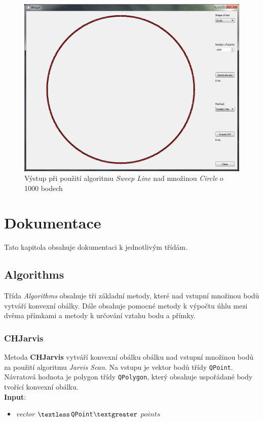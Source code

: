 \documentclass[a4paper, 12pt]{article}
\begin{document}
\begin{figure}[h!]
	\centering
	\includegraphics[width=13cm]{./pictures/app_circle_sweep.png}
	\caption{Výstup při použití algoritmu \textit{Sweep Line} nad množinou \textit{Circle} o 1000 bodech}
\end{figure}

\clearpage
 
\section{Dokumentace}
Tato kapitola obsahuje dokumentaci k jednotlivým třídám.

\subsection{Algorithms}
Třída \textit{Algorithms} obsahuje tři základní metody, které nad vstupní množinou bodů vytváří konvexní obálky. Dále obsahuje pomocné metody k výpočtu úhlu mezi dvěma přímkami a metody k určování vztahu bodu a přímky.

\subsubsection*{CHJarvis}
Metoda \textbf{CHJarvis} vytváří konvexní obálku obálku nad vstupní množinou bodů za použití algoritmu \textit{Jarvis Scan}. Na vstupu je vektor bodů třídy \texttt{QPoint}. Návratová hodnota je polygon třídy \texttt{QPolygon}, který obsahuje uspořádané body tvořící konvexní obálku.\\

\textbf{Input}:
\begin{itemize}
\item \textsl{vector} $\textless$\texttt{QPoint}$\textgreater$ $points$
\end{itemize}
\end{document}
